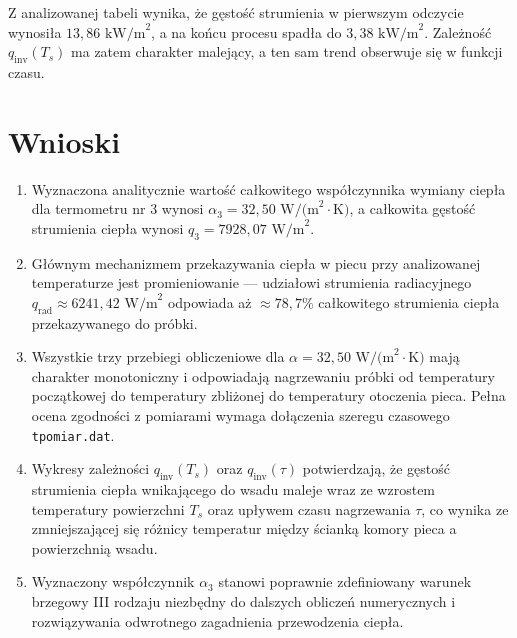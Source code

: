 \documentclass[12pt,a4paper]{article}
\begin{document}
Z analizowanej tabeli wynika, że gęstość strumienia w pierwszym odczycie wynosiła $13{,}86\text{ kW/m}^2$, a na końcu procesu spadła do $3{,}38\text{ kW/m}^2$. Zależność $q_{\text{inv}}(T_s)$ ma zatem charakter malejący, a ten sam trend obserwuje się w funkcji czasu.

\section{Wnioski}

\begin{enumerate}
    \item Wyznaczona analitycznie wartość całkowitego współczynnika wymiany ciepła dla termometru nr 3 wynosi $\alpha_3 = 32{,}50 \text{ W/(m}^2 \cdot \text{K)}$, a całkowita gęstość strumienia ciepła wynosi $q_3 = 7928{,}07 \text{ W/m}^2$.
    
    \item Głównym mechanizmem przekazywania ciepła w piecu przy analizowanej temperaturze jest promieniowanie --- udziałowi strumienia radiacyjnego $q_{\text{rad}} \approx 6241{,}42 \text{ W/m}^2$ odpowiada aż $\approx 78{,}7\%$ całkowitego strumienia ciepła przekazywanego do próbki.
    
    \item Wszystkie trzy przebiegi obliczeniowe dla $\alpha = 32{,}50 \text{ W/(m}^2 \cdot \text{K)}$ mają charakter monotoniczny i odpowiadają nagrzewaniu próbki od temperatury początkowej do temperatury zbliżonej do temperatury otoczenia pieca. Pełna ocena zgodności z pomiarami wymaga dołączenia szeregu czasowego \texttt{tpomiar.dat}.
    
    \item Wykresy zależności $q_{\text{inv}}(T_s)$ oraz $q_{\text{inv}}(\tau)$ potwierdzają, że gęstość strumienia ciepła wnikającego do wsadu maleje wraz ze wzrostem temperatury powierzchni $T_s$ oraz upływem czasu nagrzewania $\tau$, co wynika ze zmniejszającej się różnicy temperatur między ścianką komory pieca a powierzchnią wsadu.
    
    \item Wyznaczony współczynnik $\alpha_3$ stanowi poprawnie zdefiniowany warunek brzegowy III rodzaju niezbędny do dalszych obliczeń numerycznych i rozwiązywania odwrotnego zagadnienia przewodzenia ciepła.
\end{enumerate}
\end{document}
